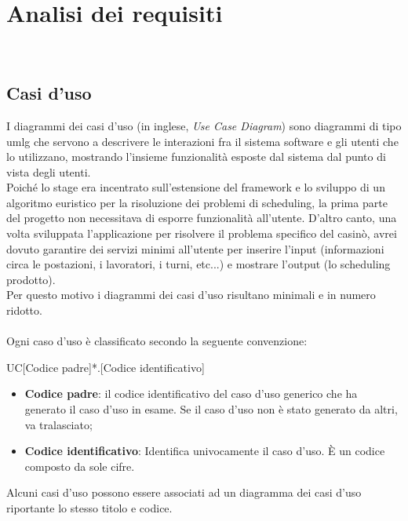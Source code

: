 
\chapter{Analisi dei requisiti}
\label{cap:analisi-requisiti}

\\

\section{Casi d'uso}
I diagrammi dei casi d'uso (in inglese, \textit{Use Case Diagram}) sono diagrammi di tipo \gls{umlg} che servono a descrivere le interazioni fra il sistema software e gli utenti che lo utilizzano, mostrando l'insieme funzionalità esposte dal sistema dal punto di vista degli utenti. \\
Poiché lo stage era incentrato sull'estensione del framework e lo sviluppo di un algoritmo euristico per la risoluzione dei problemi di scheduling, la prima parte del progetto non necessitava di esporre funzionalità all'utente. D'altro canto, una volta sviluppata l'applicazione per risolvere il problema specifico del casinò, avrei dovuto garantire dei servizi minimi all'utente per inserire l'input (informazioni circa le postazioni, i lavoratori, i turni, etc...) e mostrare l'output (lo scheduling prodotto). \\
Per questo motivo i diagrammi dei casi d'uso risultano minimali e in numero ridotto.\\
\\
Ogni caso d'uso è classificato secondo la seguente convenzione:
\begin{center}
    UC[Codice padre]*.[Codice identificativo]
\end{center}

\begin{itemize}
    \item \textbf{Codice padre}: \MakeUppercase{} il codice identificativo del caso d'uso generico che ha generato il caso d'uso in esame. Se il caso d'uso non è stato generato da altri, va tralasciato;
    \item \textbf{Codice identificativo}: Identifica univocamente il caso d'uso. \MakeUppercase{è} un codice composto da sole cifre. 
\end{itemize}
\noindent
Alcuni casi d'uso possono essere associati ad un diagramma dei casi d'uso riportante lo stesso titolo e codice.
\clearpage
